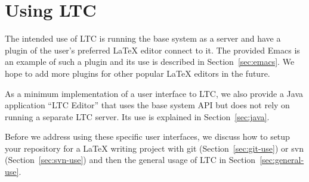 \chapter{Using LTC}

The intended use of LTC is running the base system as a server and have a plugin of the user's preferred LaTeX editor connect to it.  The provided Emacs  is an example of such a plugin and its use is described in Section~\ref{sec:emacs}.  We hope to add more plugins for other popular LaTeX editors in the future.

As a minimum implementation of a user interface to LTC, we also provide a Java application ``LTC Editor'' that uses the base system API but does not rely on running a separate LTC server.  Its use is explained in Section~\ref{sec:java}.

Before we address using these specific user interfaces, we discuss how to setup your repository for a LaTeX writing project with git (Section~\ref{sec:git-use}) or svn (Section~\ref{sec:svn-use}) and then the general usage of LTC in Section~\ref{sec:general-use}.







